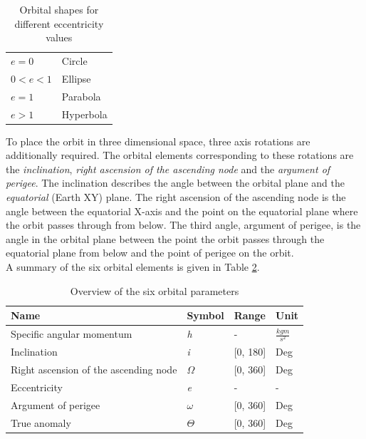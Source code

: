 \begin{table}[h]
\centering
\begin{tabular}{@{}ll@{}}
\toprule
$e = 0$      & Circle    \\
$0 < e < 1 $ & Ellipse   \\
$e = 1$      & Parabola  \\
$e > 1 $     & Hyperbola \\
\bottomrule
\end{tabular}
\caption{Orbital shapes for different eccentricity values}
\label{table:eccentricity}
\end{table}


To place the orbit in three dimensional space, three axis rotations are additionally required. The orbital elements corresponding to these rotations are the \textit{inclination}, \textit{right ascension of the ascending node} and the \textit{argument of perigee}. The inclination describes the angle between the orbital plane and the \textit{equatorial} (Earth XY) plane. The right ascension of the ascending node is the angle between the equatorial X-axis and the point on the equatorial plane where the orbit passes through from below. The third angle, argument of perigee, is the angle in the orbital plane between the point the orbit passes through the equatorial plane from below and the point of perigee on the orbit. \\


A summary of the six orbital elements is given in Table \ref{table:orbital_parameters}. \\


\begin{table}[h]
\centering
\begin{tabular}{@{}llll@{}}
\toprule
Name                                  & Symbol              & Range     & Unit \\ \midrule
Specific angular momentum             & \textit{h}          & -         & $\frac{kgm}{s^2}$ \\
Inclination                           & \textit{i}          & [0, 180]  & Deg    \\
Right ascension of the ascending node & $\mathit{\Omega}$   & [0, 360]  & Deg  \\
Eccentricity                          & \textit{e}          & -         & -    \\
Argument of perigee                   & $\mathit{\omega}$   & [0, 360]  & Deg  \\
True anomaly                          & $\mathit{\Theta}$   & [0, 360]  & Deg  \\ \bottomrule
\end{tabular}
\caption{Overview of the six orbital parameters}
\label{table:orbital_parameters}
\end{table}








